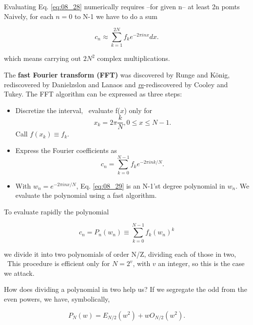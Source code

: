 Evaluating Eq. \ref{eq:08_28} numerically requires --for given n-- at least 2n pomts Naively, for each $n = 0$ to N-1 we have to do a sum

\begin{equation*}
c_{n} \approx \sum_{k=1}^{2N}f_{k}e^{-2\pi inx}dx .
\end{equation*}

which means carrying out $2N^2$ complex multiplications.

The \textbf{fast Fourier transform (FFT)} was discovered by Runge and K\"{o}nig, rediscovered by Danielzslon and Lanaos and \textit{\underline{re}}-rediscovered by Cooley and Tukey. The FFT algorithm can be expressed as three steps:

\begin{itemize}
    \item Discretize the interval, \ie\ evaluate f($x$) only for
    \begin{equation*}
        x_{k} = 2\pi \frac{k}{N} , 0 \leq x \leq N-1.
    \end{equation*}
    Call $f(x_k) \equiv f_k$.
    \item   Express the Fourier coefficients as
    \begin{equation}\label{eq:08_29}
        c_{n} = \sum_{k=0}^{N-1}f_{k}e^{-2\pi ink/N} .
    \end{equation}
    \item With $w_{n} = e^{-2\pi inx/N}$, Eq. \ref{eq:08_29} is an N-1’st degree polynomial in $w_{n}$. We evaluate the polynomial using a fast algorithm.
\end{itemize}

To evaluate rapidly the polynomial

\begin{equation*}
c_{n} = P_{n}(w_{n}) \equiv \sum_{k=0}^{N-1}f_{k}(w_{n})^k
\end{equation*}

we divide it into two polynomials of order N/Z, dividing each of those in two, \etc\ This procedure is efficient only for $N=2^v$, with $v$ an integer, so this is the case we attack.

How does dividing a polynomial in two help us? If we segregate the odd from the even powers, we have, symbolically,

\begin{equation}\label{eq:08_30}
P_{N}(w) = E_{N/2}(w^{2}) + w O_{N/2}(w^2).
\end{equation}

